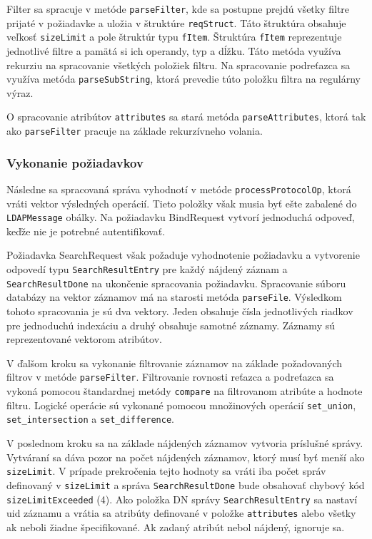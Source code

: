 \documentclass[11pt,a4paper]{article}
\begin{document}
Filter sa spracuje v metóde \texttt{parseFilter}, kde sa postupne prejdú všetky filtre prijaté v požiadavke a uložia v štruktúre \texttt{reqStruct}. Táto štruktúra obsahuje veľkosť \texttt{sizeLimit} a pole štruktúr typu \texttt{fItem}. Štruktúra \texttt{fItem} reprezentuje jednotlivé filtre a pamätá si ich operandy, typ a dĺžku. Táto metóda využíva rekurziu na spracovanie všetkých položiek filtru. Na spracovanie podreťazca sa využíva metóda \texttt{parseSubString}, ktorá prevedie túto položku filtra na regulárny výraz.

O spracovanie atribútov \texttt{attributes} sa stará metóda \texttt{parseAttributes}, ktorá tak ako \texttt{parseFilter} pracuje na základe rekurzívneho volania.

\subsubsection{Vykonanie požiadavkov}
Následne sa spracovaná správa vyhodnotí v metóde \texttt{processProtocolOp}, ktorá vráti vektor výsledných operácií. Tieto položky však musia byť ešte zabalené do \texttt{LDAPMessage} obálky. Na požiadavku BindRequest vytvorí jednoduchá odpoveď, keďže nie je potrebné autentifikovať.

Požiadavka SearchRequest však požaduje vyhodnotenie požiadavku a vytvorenie odpovedí typu \texttt{SearchResultEntry} pre každý nájdený záznam a \texttt{SearchResultDone} na ukončenie spracovania požiadavku. Spracovanie súboru databázy na vektor záznamov má na starosti metóda \texttt{parseFile}. Výsledkom tohoto spracovania je sú dva vektory. Jeden obsahuje čísla jednotlivých riadkov pre jednoduchú indexáciu a druhý obsahuje samotné záznamy. Záznamy sú reprezentované vektorom atribútov.

V ďalšom kroku sa vykonanie filtrovanie záznamov na základe požadovaných filtrov v metóde \texttt{parseFilter}. Filtrovanie rovnosti reťazca a podreťazca sa vykoná pomocou štandardnej metódy \texttt{compare} na filtrovanom atribúte a hodnote filtru. Logické operácie sú vykonané pomocou množinových operácií \verb|set_union|, \verb|set_intersection| a \verb|set_difference|.

V poslednom kroku sa na základe nájdených záznamov vytvoria príslušné správy. Vytváraní sa dáva pozor na počet nájdených záznamov, ktorý musí byť menší ako \texttt{sizeLimit}. V prípade prekročenia tejto hodnoty sa vráti iba počet správ definovaný v \texttt{sizeLimit} a správa \texttt{SearchResultDone} bude obsahovať chybový kód \texttt{sizeLimitExceeded} (4). Ako položka DN správy \texttt{SearchResultEntry} sa nastaví uid záznamu a vrátia sa atribúty definované v položke \texttt{attributes} alebo všetky ak neboli žiadne špecifikované. Ak zadaný atribút nebol nájdený, ignoruje sa.
\end{document}
